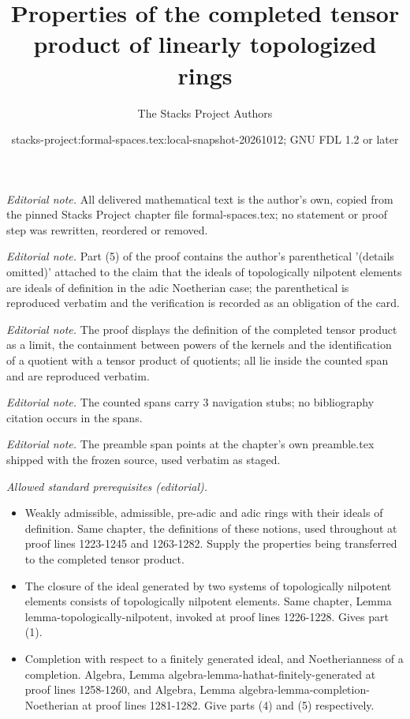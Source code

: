 \documentclass{stacks-project}
\title{Properties of the completed tensor product of linearly topologized rings}
\author{The Stacks Project Authors}
\date{stacks-project:formal-spaces.tex:local-snapshot-20261012; GNU FDL 1.2 or later}
\theoremstyle{plain}
\theoremstyle{definition}
\theoremstyle{remark}
\numberwithin{equation}{subsection}
\begin{document}
\maketitle
\noindent\textit{Editorial note.} All delivered mathematical text is the author's own, copied from the pinned Stacks Project chapter file formal-spaces.tex; no statement or proof step was rewritten, reordered or removed.\par\medskip
\noindent\textit{Editorial note.} Part (5) of the proof contains the author's parenthetical '(details omitted)' attached to the claim that the ideals of topologically nilpotent elements are ideals of definition in the adic Noetherian case; the parenthetical is reproduced verbatim and the verification is recorded as an obligation of the card.\par\medskip
\noindent\textit{Editorial note.} The proof displays the definition of the completed tensor product as a limit, the containment between powers of the kernels and the identification of a quotient with a tensor product of quotients; all lie inside the counted span and are reproduced verbatim.\par\medskip
\noindent\textit{Editorial note.} The counted spans carry 3 navigation stubs; no bibliography citation occurs in the spans.\par\medskip
\noindent\textit{Editorial note.} The preamble span points at the chapter's own preamble.tex shipped with the frozen source, used verbatim as staged.\par\medskip
\noindent\textit{Allowed standard prerequisites (editorial).}\begin{itemize}
\item Weakly admissible, admissible, pre-adic and adic rings with their ideals of definition. Same chapter, the definitions of these notions, used throughout at proof lines 1223-1245 and 1263-1282. Supply the properties being transferred to the completed tensor product.
\item The closure of the ideal generated by two systems of topologically nilpotent elements consists of topologically nilpotent elements. Same chapter, Lemma lemma-topologically-nilpotent, invoked at proof lines 1226-1228. Gives part (1).
\item Completion with respect to a finitely generated ideal, and Noetherianness of a completion. Algebra, Lemma algebra-lemma-hathat-finitely-generated at proof lines 1258-1260, and Algebra, Lemma algebra-lemma-completion-Noetherian at proof lines 1281-1282. Give parts (4) and (5) respectively.
\end{itemize}\medskip
\end{document}
